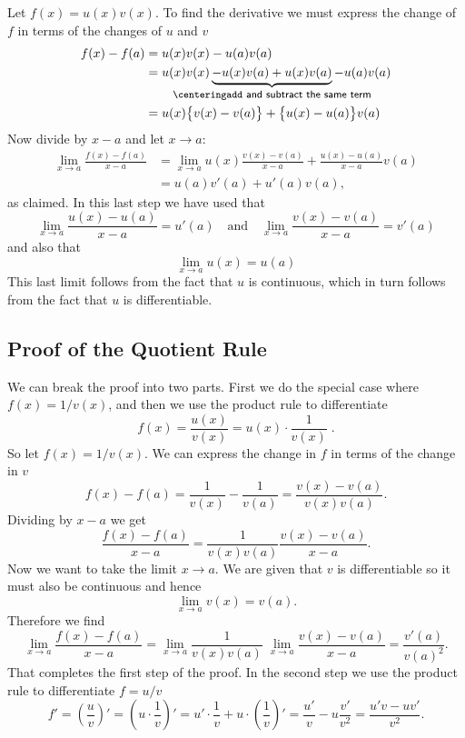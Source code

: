 Let $f(x) = u(x)v(x)$.  To find the derivative we must express the
change of $f$ in terms of the changes of $u$ and $v$
\begin{align*}
  f(x)-f(a) &= u(x)v(x)-u(a)v(a) \\
  &= u(x)v(x)\underbrace{-u(x)v(a)+u(x)v(a)}_{%
    \makebox[0pt]{\footnotesize\sffamily\centering%
      add and subtract the same term}}
    -u(a)v(a)\\
  &=u(x)\bigl\{v(x)-v(a)\bigr\} + \bigl\{u(x)-u(a)\bigr\}v(a)
\end{align*}   
Now divide by $x-a$ and let $x\to a$:
\begin{align*}
  \lim_{x\to a} \frac{f(x)-f(a)}{x-a}
  &= \lim_{x\to a} u(x) \frac{v(x)-v(a)}{x-a} +
  \frac{u(x)-u(a)}{x-a} v(a) \\[1ex]
  &= u(a)v'(a) + u'(a)v(a),
\end{align*} 
as claimed.  In this last step we have used that
\[
\lim_{x\to a}\frac{u(x)-u(a)}{x-a} = u'(a)
\quad\text{and}\quad
\lim_{x\to a}\frac{v(x)-v(a)}{x-a} = v'(a)
\]
and also that
\[
\lim_{x\to a} u(x) = u(a)
\]
This last limit follows from the fact that $u$ is continuous,
which in turn follows from the fact that $u$ is differentiable. 





\subsection{Proof of the Quotient Rule} \label{sec:proof-of-quotient-rule}
We can break the proof into two parts.  First we do the special case
where $f(x) = 1/v(x)$, and then we use the product rule to
differentiate
\[
f(x) = \frac{u(x)}{v(x)} = u(x)\cdot\frac1{v(x)}\;.
\]
So let $f(x) = 1/v(x)$.  We can express the change in $f$ in terms of
the change in $v$
\[
f(x)-f(a) = \frac1{v(x)} - \frac1{v(a)}
=\frac{v(x)-v(a)}{v(x)v(a)}.
\]
Dividing by $x-a$ we get
\[
\frac{f(x)-f(a)}{x-a} = \frac1{v(x)v(a)} \frac{v(x)- v(a)}{x-a}.
\]
Now we want to take the limit $x\to a$.  We are given that $v$ is
differentiable so it must also be continuous and hence
\[
\lim_{x\to a}v(x) = v(a).
\]
Therefore we find
\[
\lim_{x\to a} \frac{f(x)-f(a)}{x-a} =
\lim_{x\to a}\frac1{v(x)v(a)} \;\lim_{x\to a} \frac{v(x)- v(a)}{x-a}
=\frac{v'(a)}{v(a)^2}.
\]
That completes the first step of the proof.  In the second step
we use the product rule to differentiate $f=u/v$
\[
f' = \left( \frac uv \right)' 
=\left( u\cdot \frac 1v \right)'
=u'\cdot\frac1v + u\cdot\left(  \frac1v\right)'
=\frac{u'}v - u\frac{v'}{v^2}
=\frac{u'v -uv'}{v^2}.
\]



